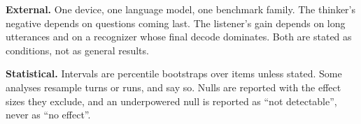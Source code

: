 \textbf{External.} One device, one language model, one benchmark family.
The thinker's negative depends on questions coming last. The listener's gain
depends on long utterances and on a recognizer whose final decode dominates.
Both are stated as conditions, not as general results.

\textbf{Statistical.} Intervals are percentile bootstraps over items unless
stated. Some analyses resample turns or runs, and say so. Nulls are reported
with the effect sizes they exclude, and an underpowered null is reported as
``not detectable'', never as ``no effect''.
